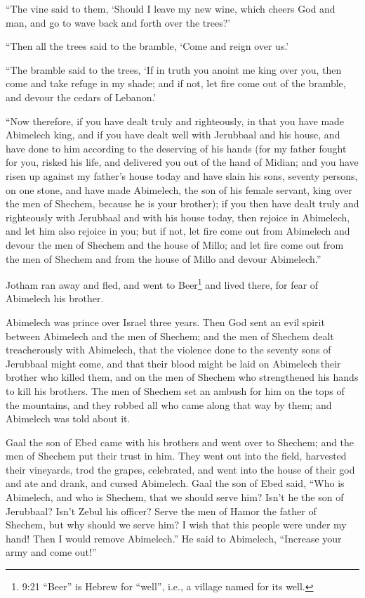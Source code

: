 \myverse{}“The vine said to them, ‘Should I leave my new wine, which cheers
God and man, and go to wave back and forth over the trees?’

\myverse{}“Then all the trees said to the bramble, ‘Come and reign over
us.’

\myverse{}“The bramble said to the trees, ‘If in truth you anoint me king
over you, then come and take refuge in my shade; and if not, let fire come out of the bramble, and devour
the cedars of Lebanon.’

\myverse{}“Now therefore, if you have dealt truly and righteously, in that
you have made Abimelech king, and if you have dealt well with Jerubbaal and his house, and have done to
him according to the deserving of his hands
\myverse{}(for my father fought for you, risked his life, and delivered you out of the
hand of Midian;
\myverse{}and you have risen up against my father’s house today and have slain his sons,
seventy persons, on one stone, and have made Abimelech, the son of his female servant, king over the men
of Shechem, because he is your brother);
\myverse{}if you then have dealt truly and righteously with Jerubbaal and with his house
today, then rejoice in Abimelech, and let him also rejoice in you;
\myverse{}but if not, let fire come out from Abimelech and devour the men of Shechem
and the house of Millo; and let fire come out from the men of Shechem and from the house of Millo and
devour Abimelech.”

\myverse{}Jotham ran away and fled, and went to Beer\footnote{9:21 “Beer” is Hebrew for “well”, i.e., a village named for its well.} and lived there, for
fear of Abimelech his brother.

\myverse{}Abimelech was prince over Israel three years.
\myverse{}Then God sent an evil spirit between Abimelech and the men of Shechem; and
the men of Shechem dealt treacherously with Abimelech,
\myverse{}that the violence done to the seventy sons of Jerubbaal might come, and that
their blood might be laid on Abimelech their brother who killed them, and on the men of Shechem who strengthened
his hands to kill his brothers.
\myverse{}The men of Shechem set an ambush for him on the tops of the mountains, and
they robbed all who came along that way by them; and Abimelech was told about it.

\myverse{}Gaal the son of Ebed came with his brothers and went over to
Shechem; and the men of Shechem put their trust in him.
\myverse{}They went out into the field, harvested their vineyards, trod the grapes,
celebrated, and went into the house of their god and ate and drank, and cursed Abimelech.
\myverse{}Gaal the son of Ebed said, “Who is Abimelech, and who is Shechem, that we
should serve him? Isn’t he the son of Jerubbaal? Isn’t Zebul his officer? Serve the men of Hamor the father
of Shechem, but why should we serve him?
\myverse{}I wish that this people were under my hand! Then I would remove Abimelech.”
He said to Abimelech, “Increase your army and come out!”

